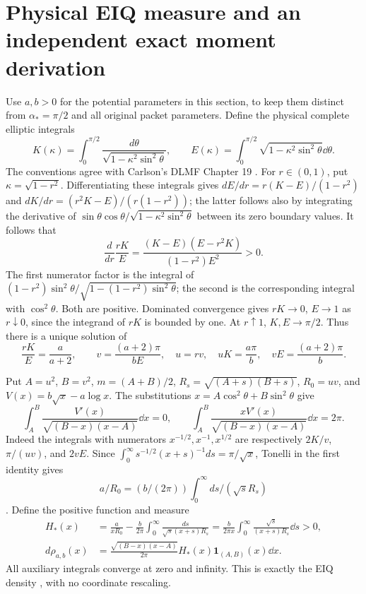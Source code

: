 \section{Physical EIQ measure and an independent exact moment derivation}
\label{a02ts:eqphysical}
Use $a,b>0$ for the potential parameters in this section, to keep them
distinct from $\alpha_*=\pi/2$ and all original packet parameters.
Define the physical complete elliptic integrals
\[
 K(\kappa)=\int_0^{\pi/2}\frac{d\theta}{\sqrt{1-\kappa^2\sin^2\theta}},
 \qquad E(\kappa)=\int_0^{\pi/2}\sqrt{1-\kappa^2\sin^2\theta}\dd\theta.
\]
The conventions agree with Carlson's DLMF Chapter 19 \cite{a02ts:elliptic}.
For $r\in(0,1)$, put $\kappa=\sqrt{1-r^2}$. Differentiating these
integrals gives $dE/dr=r(K-E)/(1-r^2)$ and
$dK/dr=(r^2K-E)/(r(1-r^2))$; the latter follows also by integrating
the derivative of $\sin\theta\cos\theta/
\sqrt{1-\kappa^2\sin^2\theta}$ between its zero boundary values.
It follows that
\begin{equation}\tag{TS21}
 \frac d{dr}\frac{rK}{E}
 =\frac{(K-E)(E-r^2K)}{(1-r^2)E^2}>0.
\end{equation}
The first numerator factor is the integral of
$(1-r^2)\sin^2\theta/\sqrt{1-(1-r^2)\sin^2\theta}$;
the second is the corresponding integral with $\cos^2\theta$.
Both are positive. Dominated convergence gives $rK\to0$, $E\to1$
as $r\downarrow0$, since the integrand of $rK$ is bounded by one.
At $r\uparrow1$, $K,E\to\pi/2$. Thus there is a unique solution of
\begin{equation}\tag{TS22}
 \frac{rK}{E}=\frac a{a+2},\qquad
 v=\frac{(a+2)\pi}{bE},\quad u=rv,
 \quad uK=\frac{a\pi}{b},\quad vE=\frac{(a+2)\pi}{b}.
\end{equation}

Put $A=u^2$, $B=v^2$, $m=(A+B)/2$, $R_s=\sqrt{(A+s)(B+s)}$,
$R_0=uv$, and $V(x)=b\sqrt x-a\log x$.
The substitutions $x=A\cos^2\theta+B\sin^2\theta$ give
\[
 \int_A^B\frac{V'(x)}{\sqrt{(B-x)(x-A)}}\dd x=0,\qquad
 \int_A^B\frac{xV'(x)}{\sqrt{(B-x)(x-A)}}\dd x=2\pi.
\]
Indeed the integrals with numerators $x^{-1/2},x^{-1},x^{1/2}$
are respectively $2K/v$, $\pi/(uv)$, and $2vE$.
Since $\int_0^\infty s^{-1/2}(x+s)^{-1}ds=\pi/\sqrt x$,
Tonelli in the first identity gives
\[a/R_0=(b/(2\pi))\int_0^\infty ds/(\sqrt sR_s)\].
Define the positive function and measure
\begin{equation}\tag{TS23}\begin{aligned}
 H_*(x)&=\frac{a}{xR_0}-\frac b{2\pi}\int_0^\infty
           \frac{ds}{\sqrt s(x+s)R_s}
 =\frac b{2\pi x}\int_0^\infty\frac{\sqrt s}{(x+s)R_s}\dd s>0,\\
 d\rho_{a,b}(x)&=\frac{\sqrt{(B-x)(x-A)}}{2\pi}H_*(x)
                 \mathbf1_{(A,B)}(x)\dd x.
\end{aligned}\end{equation}
All auxiliary integrals converge at zero and infinity. This is exactly
the EIQ density \cite{a02ts:EIQ}, with no coordinate rescaling.

